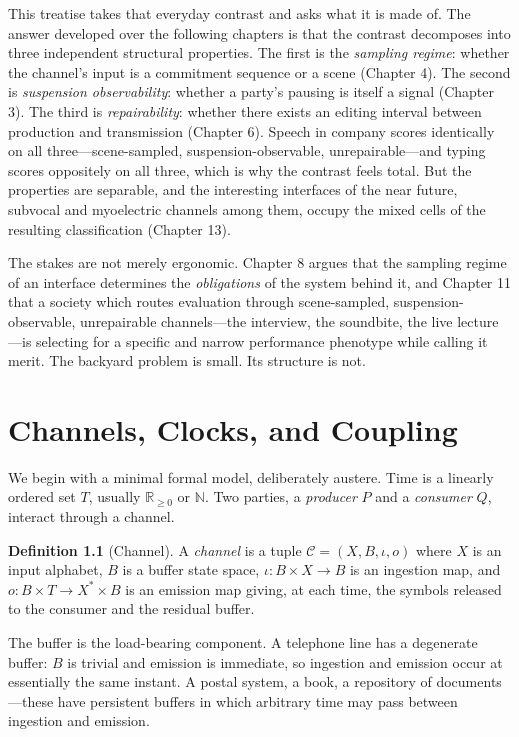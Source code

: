 \documentclass[11pt,oneside]{book}
\theoremstyle{plain}
\theoremstyle{definition}
\newtheorem{definition}[theorem]{Definition}
\theoremstyle{remark}
\newcommand{\Chan}{\mathcal{C}}
\begin{document}
This treatise takes that everyday contrast and asks what it is made of. The answer developed over the following chapters is that the contrast decomposes into three independent structural properties. The first is the \emph{sampling regime}: whether the channel's input is a commitment sequence or a scene (Chapter 4). The second is \emph{suspension observability}: whether a party's pausing is itself a signal (Chapter 3). The third is \emph{repairability}: whether there exists an editing interval between production and transmission (Chapter 6). Speech in company scores identically on all three---scene-sampled, suspension-observable, unrepairable---and typing scores oppositely on all three, which is why the contrast feels total. But the properties are separable, and the interesting interfaces of the near future, subvocal and myoelectric channels among them, occupy the mixed cells of the resulting classification (Chapter 13).

The stakes are not merely ergonomic. Chapter 8 argues that the sampling regime of an interface determines the \emph{obligations} of the system behind it, and Chapter 11 that a society which routes evaluation through scene-sampled, suspension-observable, unrepairable channels---the interview, the soundbite, the live lecture---is selecting for a specific and narrow performance phenotype while calling it merit. The backyard problem is small. Its structure is not.

\chapter{Channels, Clocks, and Coupling}

We begin with a minimal formal model, deliberately austere. Time is a linearly ordered set $T$, usually $\mathbb{R}_{\geq 0}$ or $\mathbb{N}$. Two parties, a \emph{producer} $P$ and a \emph{consumer} $Q$, interact through a channel.

\begin{definition}[Channel]
A \emph{channel} is a tuple $\Chan = (X, B, \iota, o)$ where $X$ is an input alphabet, $B$ is a buffer state space, $\iota : B \times X \to B$ is an ingestion map, and $o : B \times T \to X^{*} \times B$ is an emission map giving, at each time, the symbols released to the consumer and the residual buffer.
\end{definition}

The buffer is the load-bearing component. A telephone line has a degenerate buffer: $B$ is trivial and emission is immediate, so ingestion and emission occur at essentially the same instant. A postal system, a book, a repository of documents---these have persistent buffers in which arbitrary time may pass between ingestion and emission.
\end{document}
